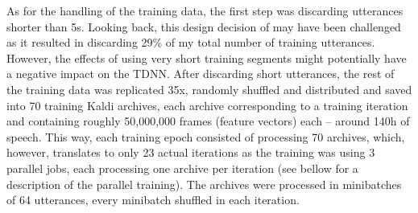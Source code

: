 \documentclass[bsc,frontabs,twoside,singlespacing,parskip,deptreport]{infthesis}
\begin{document}
{{{      %
      As for the handling of the training data, the first step was discarding utterances shorter than 5s. Looking back, this design decision of \citet{Snyder_et_al_2018} may have been challenged as it resulted in discarding 29\% of my total number of training utterances. However, the effects of using very short training segments might potentially have a negative impact on the TDNN. After discarding short utterances, the rest of the training data was replicated 35x, randomly shuffled and distributed and saved into 70 training Kaldi archives, each archive corresponding to a training iteration and containing roughly 50,000,000 frames (feature vectors) each -- around 140h of speech. This way, each training epoch consisted of processing 70 archives, which, however, translates to only 23 actual iterations as the training was using 3 parallel jobs, each processing one archive per iteration (see bellow for a description of the parallel training). The archives were processed in minibatches of 64 utterances, every minibatch shuffled in each iteration.

}}}
\end{document}
